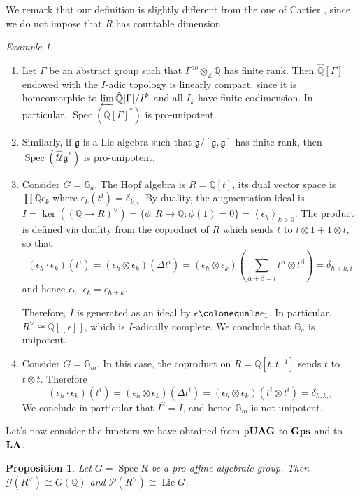 \documentclass{amsart}
\newtheorem{prop}[thm]{Proposition}
\theoremstyle{definition}
\theoremstyle{remark}
\theoremstyle{remark}
\newtheorem{example}[thm]{Example}
\newcommand{\Q}{\mathbb{Q}}
\newcommand{\Z}{\mathbb{Z}}
\newcommand{\ra}{\rightarrow}
\newcommand{\mcG}{\mathcal{G}}
\newcommand{\mcP}{\mathcal{P}}
\newcommand{\mcU}{\mathcal{U}}
\newcommand{\mfg}{\mathfrak{g}}
\DeclareMathOperator{\Lie}{Lie}
\DeclareMathOperator{\Spec}{Spec}
\DeclareMathOperator{\Gps}{\bf{Gps}}
\DeclareMathOperator{\LA}{\bf{LA}}
\DeclareMathOperator{\pUAG}{p\bf{UAG}}
\begin{document}
We remark that our definition is slightly different from the one of Cartier \cite[end of p. 53]{cartier-ha}, since we do not impose that $R$ has countable dimension. 

\begin{example}
\begin{enumerate}
	\item Let $\Gamma$ be an abstract group such that $\Gamma^{ab}\otimes_\Z\Q$ has finite rank. Then $\hat{\Q}[\Gamma]$ endowed with the $I$-adic topology is linearly compact, since it is homeomorphic to $\varprojlim \hat{\Q}[\Gamma]/I^k$ and all $I_k$ have finite codimension. In particular, $\Spec(\hat{\Q}[\Gamma]^*)$ is pro-unipotent.
	\item Similarly, if $\mfg$ is a Lie algebra such that $\mfg/[\mfg,\mfg]$ has finite rank, then $\Spec(\hat{\mcU}\mfg^*)$ is pro-unipotent.
	\item Consider $G=\mathbb{G}_a$. The Hopf algebra is $R=\Q[t]$, its dual vector space is $\prod\Q\epsilon_k$ where $\epsilon_k(t^i)=\delta_{k,i}$. By duality, the augmentation ideal is $I=\ker((\Q\ra R)^\vee)=\{\phi\colon R\ra\Q\colon \phi(1)=0\}=\left\langle \epsilon_k\right\rangle_{k>0}$. The product is defined via duality from the coproduct of $R$ which sends $t$ to $t\otimes1 +1\otimes t$, so that
	\[
	(\epsilon_h\cdot\epsilon_k)(t^i)=(\epsilon_h\otimes\epsilon_k)(\Delta t^i)=(\epsilon_h\otimes\epsilon_k)(\sum_{\alpha+\beta=i} t^\alpha\otimes t^\beta)=\delta_{h+k,i}
	\]
	and hence $\epsilon_h\cdot\epsilon_k=\epsilon_{h+k}$.
	
	Therefore, $I$ is generated as an ideal by $\epsilon\colonequals\epsilon_1$. In particular, $R^\vee\cong\Q[[\epsilon]]$, which is $I$-adically complete. We conclude that $\mathbb{G}_a$ is unipotent.
	
	\item Consider $G=\mathbb{G}_m$. In this case, the coproduct on $R=\Q[t,t^{-1}]$ sends $t$ to $t\otimes t$. Therefore
	\[
	(\epsilon_h\cdot\epsilon_k)(t^i)=(\epsilon_h\otimes\epsilon_k)(\Delta t^i)=(\epsilon_h\otimes\epsilon_k)(t^i\otimes t^i)=\delta_{h,k,i}
	\]
	We conclude in particular that $I^2=I$, and hence $\mathbb{G}_m$ is not unipotent.
\end{enumerate}
\end{example}

Let's now consider the functors we have obtained from $\pUAG$ to $\Gps$ and to $\LA$.
\begin{prop}
Let $G=\Spec R$ be a pro-affine algebraic group. Then $\mcG (R^\vee)\cong G(\Q)$ and $\mcP(R^\vee)\cong\Lie G$. 
\end{prop}
\end{document}
